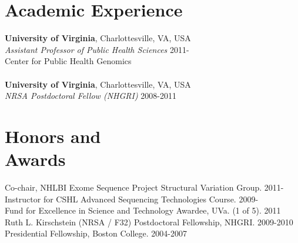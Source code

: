 \documentclass[margin,line]{cv}
\begin{document}
\begin{resume}
    \section{\mysidestyle Academic Experience}

    \textbf{University of Virginia}, Charlottesville, VA, USA\\
    \textit{Assistant Professor of Public Health Sciences}                              \hfill 2011-\\
    Center for Public Health Genomics\\
    \\
    \textbf{University of Virginia}, Charlottesville, VA, USA\\
    \textit{NRSA Postdoctoral Fellow (NHGRI)}                                          \hfill 2008-2011\\


    \section{\mysidestyle Honors and\\Awards} 
    
    Co-chair, NHLBI Exome Sequence Project Structural Variation Group. 2011-                           \\\vspace{1mm}%
    Instructor for CSHL Advanced Sequencing Technologies Course. 2009-                                 \\\vspace{1mm}%
    Fund for Excellence in Science and Technology Awardee, UVa. (1 of 5). 2011                         \\\vspace{1mm}%
    Ruth L. Kirschstein (NRSA / F32) Postdoctoral Fellowship, NHGRI. 2009-2010                         \\\vspace{1mm}%
    Presidential Fellowship, Boston College. 2004-2007                                                               %
    
    

\end{resume}
\end{document}
